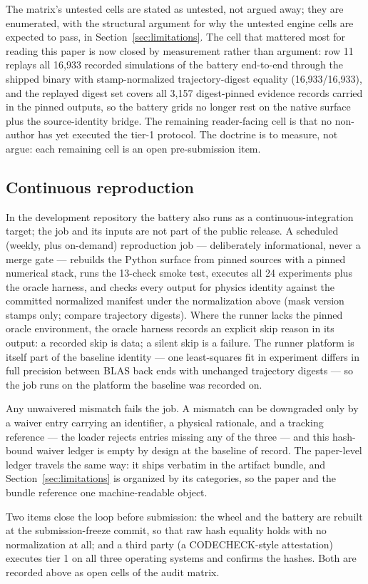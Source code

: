 The matrix's untested cells are stated as untested, not argued away;
they are enumerated, with the structural argument for why the untested
engine cells are expected to pass, in Section~\ref{sec:limitations}. The
cell that mattered most for reading this paper is now closed by
measurement rather than argument: row 11 replays all 16{,}933 recorded
simulations of the battery end-to-end through the shipped binary with
stamp-normalized trajectory-digest equality (16{,}933/16{,}933), and the
replayed digest set covers all 3{,}157 digest-pinned evidence records
carried in the pinned outputs, so the battery grids no longer rest on
the native surface plus the source-identity bridge. The remaining
reader-facing cell is that no non-author has yet executed the tier-1
protocol. The doctrine is to measure, not argue: each remaining cell is
an open pre-submission item.

\subsection{Continuous reproduction}

In the development repository the battery also runs as a
continuous-integration target; the job and its inputs are not part of
the public release. A scheduled (weekly, plus on-demand)
reproduction job --- deliberately
informational, never a merge gate --- rebuilds the Python surface from
pinned sources with a pinned numerical stack, runs the 13-check smoke
test, executes all 24 experiments plus the oracle harness, and checks
every output for physics identity against the committed normalized
manifest under the normalization above (mask version stamps only;
compare trajectory digests). Where the runner lacks the pinned oracle
environment, the oracle harness records an explicit skip reason in its
output: a recorded skip is data; a silent skip is a failure. The runner
platform is itself part of the baseline identity --- one least-squares
fit in experiment  differs in full precision between BLAS
back ends with unchanged trajectory digests --- so the job runs on the
platform the baseline was recorded on.

Any unwaivered mismatch fails the job. A mismatch can be downgraded only
by a waiver entry carrying an identifier, a physical rationale, and a
tracking reference --- the loader rejects entries missing any of the
three --- and this hash-bound waiver ledger is empty by design at the
baseline of record. The paper-level ledger travels the same way: it
ships verbatim in the artifact bundle, and Section~\ref{sec:limitations}
is organized by its categories, so the paper and the bundle reference
one machine-readable object.

Two items close the loop before submission: the wheel and the battery
are rebuilt at the submission-freeze commit, so that raw hash equality
holds with no normalization at all; and a third party (a CODECHECK-style
attestation) executes tier 1 on all three operating systems and confirms
the hashes. Both are recorded above as open cells of the audit matrix.
